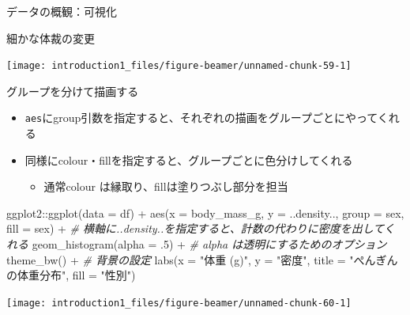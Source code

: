 \documentclass[
  ignorenonframetext,
]{beamer}
\newenvironment{Shaded}{\begin{snugshade}}{\end{snugshade}}
\newcommand{\AttributeTok}[1]{\textcolor[rgb]{0.77,0.63,0.00}{#1}}
\newcommand{\CommentTok}[1]{\textcolor[rgb]{0.56,0.35,0.01}{\textit{#1}}}
\newcommand{\DecValTok}[1]{\textcolor[rgb]{0.00,0.00,0.81}{#1}}
\newcommand{\FunctionTok}[1]{\textcolor[rgb]{0.00,0.00,0.00}{#1}}
\newcommand{\NormalTok}[1]{#1}
\newcommand{\SpecialCharTok}[1]{\textcolor[rgb]{0.00,0.00,0.00}{#1}}
\newcommand{\StringTok}[1]{\textcolor[rgb]{0.31,0.60,0.02}{#1}}
\providecommand{\tightlist}{%
  \setlength{\itemsep}{0pt}\setlength{\parskip}{0pt}}
\begin{document}
\begin{frame}[fragile]{データの概観：可視化}
\begin{block}{細かな体裁の変更}
\begin{center}\texttt{[image: introduction1\_files/figure-beamer/unnamed-chunk-59-1]} \end{center}
\end{block}

\begin{block}{グループを分けて描画する}
\protect\hypertarget{ux30b0ux30ebux30fcux30d7ux3092ux5206ux3051ux3066ux63cfux753bux3059ux308b}{}
\begin{itemize}
\tightlist
\item
  \texttt{aes}にgroup引数を指定すると、それぞれの描画をグループごとにやってくれる
\item
  同様にcolour・fillを指定すると、グループごとに色分けしてくれる

  \begin{itemize}
  \tightlist
  \item
    通常colour は縁取り、fillは塗りつぶし部分を担当
  \end{itemize}
\end{itemize}

\begin{Shaded}
\begin{Highlighting}[]
\NormalTok{ggplot2}\SpecialCharTok{::}\FunctionTok{ggplot}\NormalTok{(}\AttributeTok{data =}\NormalTok{ df) }\SpecialCharTok{+}
  \FunctionTok{aes}\NormalTok{(}\AttributeTok{x =}\NormalTok{ body\_mass\_g, }\AttributeTok{y =}\NormalTok{ ..density.., }\AttributeTok{group =}\NormalTok{ sex, }\AttributeTok{fill =}\NormalTok{ sex) }\SpecialCharTok{+} 
  \CommentTok{\# 横軸に..density..を指定すると、計数の代わりに密度を出してくれる}
  \FunctionTok{geom\_histogram}\NormalTok{(}\AttributeTok{alpha =}\NormalTok{ .}\DecValTok{5}\NormalTok{) }\SpecialCharTok{+} \CommentTok{\# alpha は透明にするためのオプション}
  \FunctionTok{theme\_bw}\NormalTok{() }\SpecialCharTok{+} \CommentTok{\# 背景の設定}
  \FunctionTok{labs}\NormalTok{(}\AttributeTok{x =} \StringTok{"体重 (g)"}\NormalTok{, }\AttributeTok{y =} \StringTok{"密度"}\NormalTok{, }\AttributeTok{title =} \StringTok{"ぺんぎんの体重分布"}\NormalTok{, }\AttributeTok{fill =} \StringTok{"性別"}\NormalTok{)}
\end{Highlighting}
\end{Shaded}

\begin{center}\texttt{[image: introduction1\_files/figure-beamer/unnamed-chunk-60-1]} \end{center}
\end{block}


\end{frame}
\end{document}
